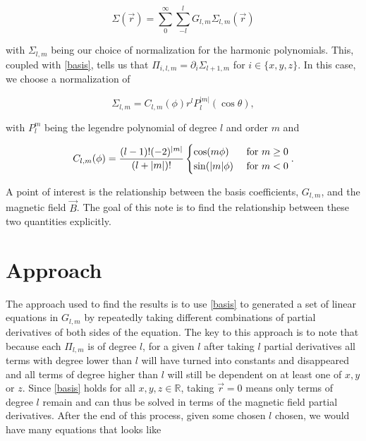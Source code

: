 \documentclass{article}
\begin{document}
\begin{equation}
    \Sigma(\vec r)=\sum_{0}^\infty\sum_{-l}^lG_{l,m}\Sigma_{l, m}(\vec r)
\end{equation}

with $\Sigma_{l, m}$ being our choice of normalization for the harmonic polynomials. This, coupled with \ref{basis}, tells us that $\Pi_{i, l, m}=\partial_i\Sigma_{l+1, m}$ for $i\in\{x, y, z\}$. In this case, we choose a normalization of

\begin{equation}
    \Sigma_{l, m}=C_{l, m}(\phi)r^lP_l^{|m|}(\cos\theta), 
\end{equation}

with $P_l^m$ being the legendre polynomial of degree $l$ and order $m$ and

\begin{equation}
    C_{l, m}(\phi)=\frac{(l-1)!(-2)^{|m|}}{(l+|m|)!}\begin{cases}
        \cos(m\phi)&\textnormal{ for } m\geq0\\
        \sin(|m|\phi)&\textnormal{ for }m<0
    \end{cases}.
\end{equation}

A point of interest is the relationship between the basis coefficients, $G_{l, m}$, and the magnetic field $\vec B$. The goal of this note is to find the relationship between these two quantities explicitly. 

\section{Approach}

The approach used to find the results is to use \ref{basis} to generated a set of linear equations in $G_{l, m}$ by repeatedly taking different combinations of partial derivatives of both sides of the equation. The key to this approach is to note that because each $\Pi_{l,m}$ is of degree $l$, for a given $l$ after taking $l$ partial derivatives all terms with degree lower than $l$ will have turned into constants and disappeared and all terms of degree higher than $l$ will still be dependent on at least one of $x, y$ or $z$. Since \ref{basis} holds for all $x, y, z\in\mathbb{R}$, taking $\vec r=0$ means only terms of degree $l$ remain and can thus be solved in terms of the magnetic field partial derivatives. After the end of this process, given some chosen $l$ chosen, we would have many equations that looks like 
\end{document}
